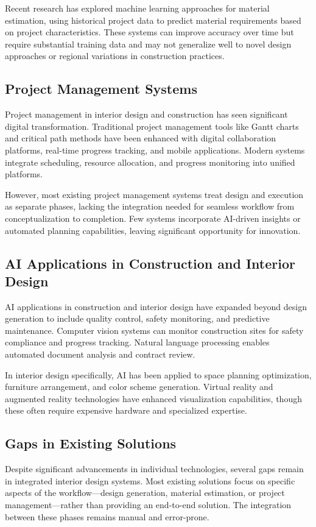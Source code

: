 \documentclass[conference]{IEEEtran}
\begin{document}
Recent research has explored machine learning approaches for material estimation, using historical project data to predict material requirements based on project characteristics. These systems can improve accuracy over time but require substantial training data and may not generalize well to novel design approaches or regional variations in construction practices.

\subsection{Project Management Systems}
Project management in interior design and construction has seen significant digital transformation. Traditional project management tools like Gantt charts and critical path methods have been enhanced with digital collaboration platforms, real-time progress tracking, and mobile applications. Modern systems integrate scheduling, resource allocation, and progress monitoring into unified platforms.

However, most existing project management systems treat design and execution as separate phases, lacking the integration needed for seamless workflow from conceptualization to completion. Few systems incorporate AI-driven insights or automated planning capabilities, leaving significant opportunity for innovation.

\subsection{AI Applications in Construction and Interior Design}
AI applications in construction and interior design have expanded beyond design generation to include quality control, safety monitoring, and predictive maintenance. Computer vision systems can monitor construction sites for safety compliance and progress tracking. Natural language processing enables automated document analysis and contract review.

In interior design specifically, AI has been applied to space planning optimization, furniture arrangement, and color scheme generation. Virtual reality and augmented reality technologies have enhanced visualization capabilities, though these often require expensive hardware and specialized expertise.

\subsection{Gaps in Existing Solutions}
Despite significant advancements in individual technologies, several gaps remain in integrated interior design systems. Most existing solutions focus on specific aspects of the workflow—design generation, material estimation, or project management—rather than providing an end-to-end solution. The integration between these phases remains manual and error-prone.
\end{document}
